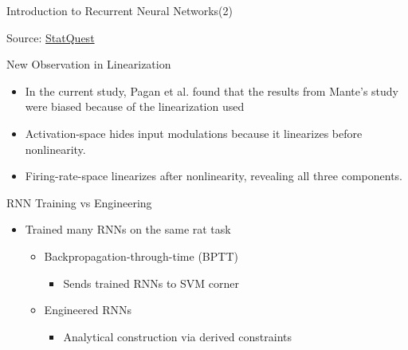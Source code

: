 \documentclass{beamer}
\begin{document}
\begin{frame}{Introduction to Recurrent Neural Networks(2)}
\begin{minipage}{0.48\linewidth}
    \label{fig:rnn}
    {\tiny Source: \href{https://www.youtube.com/watch?v=AsNTP8Kwu80}{StatQuest}}
\end{minipage}
    
\end{frame}

\begin{frame}{New Observation in Linearization}
    \begin{itemize}
        \item In the current study, Pagan et al. found that the results from Mante's study were biased because of the linearization used
        \item Activation-space hides input modulations because it linearizes before nonlinearity.
        \item Firing-rate-space linearizes after nonlinearity, revealing all three components.
    \end{itemize}
\end{frame}

\begin{frame}{RNN Training vs Engineering}

    \begin{itemize}
        \item Trained many RNNs on the same rat task
        \begin{itemize}
            \item Backpropagation-through-time (BPTT)
            \begin{itemize}
                \item Sends trained RNNs to SVM corner
            \end{itemize}
            \item Engineered RNNs
            \begin{itemize}
                \item Analytical construction via derived constraints
            \end{itemize}
        \end{itemize}
    \end{itemize}
    
\end{frame}
\end{document}

